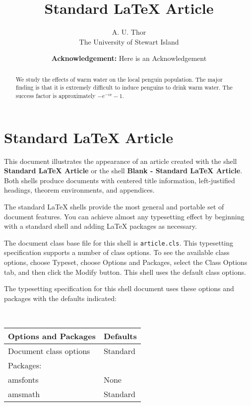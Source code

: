 \documentclass{article}
\begin{document}
\title{Standard 
\LaTeX{}
Article}
\author{A. U. Thor \\
The University of Stewart Island}
\maketitle

\begin{abstract}
We study the effects of warm water on the local penguin population. The
major finding is that it is extremely difficult to induce penguins to drink
warm water. The success factor is approximately $-e^{-i\pi }-1$.
\end{abstract}

\date{\textbf{Acknowledgement: }Here is an Acknowledgement}

\section{Standard 
\LaTeX{}
Article}

This document illustrates the appearance of an article created with the
shell \textbf{Standard LaTeX Article} or the shell \textbf{Blank - Standard
LaTeX Article}. Both shells produce documents with centered title
information, left-justified headings, theorem environments, and appendices.

The standard \LaTeX{} shells provide the most general and portable set of
document features. You can achieve almost any typesetting effect by
beginning with a standard shell and adding \LaTeX{} packages as necessary.

The document class base file for this shell is \texttt{article.cls}. This
typesetting specification supports a number of class options. To see the
available class options, choose \textsf{Typeset, }choose \textsf{Options and
Packages}, select the \textsf{Class Options} tab, and then click the \textsf{%
Modify} button. This shell uses the default class options.

The typesetting specification for this shell document uses these options and
packages with the defaults indicated:

\begin{center}
\ 
\begin{tabular}{ll}
\textbf{Options and Packages} & \textbf{Defaults} \\ \hline
Document class options & Standard \\ 
Packages: &  \\ 
\quad amsfonts & None \\ 
\quad amsmath & Standard \\ \hline
\end{tabular}
\end{center}
\end{document}
